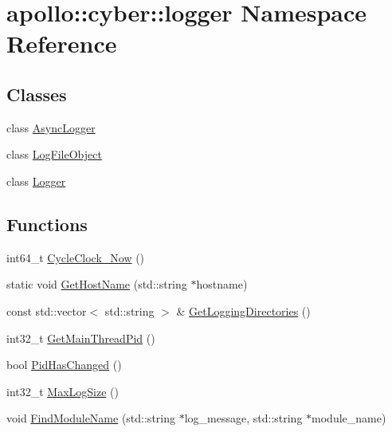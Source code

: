 \hypertarget{namespaceapollo_1_1cyber_1_1logger}{\section{apollo\-:\-:cyber\-:\-:logger Namespace Reference}
\label{namespaceapollo_1_1cyber_1_1logger}
}
\subsection*{Classes}
\begin{DoxyCompactItemize}
\item 
class \hyperlink{classapollo_1_1cyber_1_1logger_1_1AsyncLogger}{Async\-Logger}
\item 
class \hyperlink{classapollo_1_1cyber_1_1logger_1_1LogFileObject}{Log\-File\-Object}
\item 
class \hyperlink{classapollo_1_1cyber_1_1logger_1_1Logger}{Logger}
\end{DoxyCompactItemize}
\subsection*{Functions}
\begin{DoxyCompactItemize}
\item 
int64\-\_\-t \hyperlink{namespaceapollo_1_1cyber_1_1logger_aba925dc8ddf04e41bd631c3753ae6d01}{Cycle\-Clock\-\_\-\-Now} ()
\item 
static void \hyperlink{namespaceapollo_1_1cyber_1_1logger_a509a0f768e34d905ee9b733cf17682f5}{Get\-Host\-Name} (std\-::string $\ast$hostname)
\item 
const std\-::vector$<$ std\-::string $>$ \& \hyperlink{namespaceapollo_1_1cyber_1_1logger_aec45179aec37f2294675a71928c0da7c}{Get\-Logging\-Directories} ()
\item 
int32\-\_\-t \hyperlink{namespaceapollo_1_1cyber_1_1logger_a334681ec45cd64f9405c7135e37cbcca}{Get\-Main\-Thread\-Pid} ()
\item 
bool \hyperlink{namespaceapollo_1_1cyber_1_1logger_ac2c417a8a3cc95d11e1e7929cc5788f9}{Pid\-Has\-Changed} ()
\item 
int32\-\_\-t \hyperlink{namespaceapollo_1_1cyber_1_1logger_a8d55e950cfc7f5415b3c117646af57f1}{Max\-Log\-Size} ()
\item 
void \hyperlink{namespaceapollo_1_1cyber_1_1logger_a6e57417aaf22029fdb28924a53c70d6f}{Find\-Module\-Name} (std\-::string $\ast$log\-\_\-message, std\-::string $\ast$module\-\_\-name)
\end{DoxyCompactItemize}


